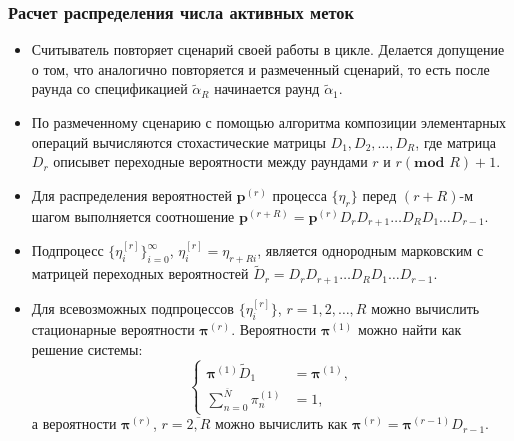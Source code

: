 \begin{frame}
    \frametitle{Расчет распределения числа активных меток}
    \footnotesize
    \begin{itemize}
        \item Считыватель повторяет сценарий своей работы в цикле. Делается допущение о том, что аналогично повторяется и размеченный сценарий, то есть после раунда со спецификацией $\widetilde{\alpha}_{R}$ начинается раунд $\widetilde{\alpha}_1$.
        \item По размеченному сценарию с помощью алгоритма композиции элементарных операций вычисляются стохастические матрицы $D_1, D_2, \dots, D_R$, где матрица $D_r$ описывет переходные вероятности между раундами $r$ и $r  (\textbf{mod } R) + 1$.
        \item Для распределения вероятностей $\bm{p}^{(r)}$ процесса $\{ \eta_r \}$ перед $(r + R)$-м шагом выполняется соотношение $\bm{p}^{(r+R)} = \bm{p}^{(r)} D_r D_{r+1} \dots D_R D_1 \dots D_{r-1}$.
        \item Подпроцесс $\{ \eta_i^{[r]} \}_{i=0}^\infty$, $\eta_i^{[r]} = \eta_{r+Ri}$, является однородным марковским с матрицей переходных вероятностей $\widetilde{D}_r = D_r D_{r+1} \dots D_R D_1 \dots D_{r-1}$.
        \item Для всевозможных подпроцессов $\{ \eta_i^{[r]} \}$, $r = 1, 2, \dots, R$ можно вычислить стационарные вероятности $\bm{\pi}^{(r)}$. Вероятности $\bm{\pi}^{(1)}$ можно найти как решение системы:
        \begin{equation*}
            \begin{cases}
                \bm{\pi}^{(1)} \widetilde{D}_1 &= \bm{\pi}^{(1)},\\
                \sum\limits_{n=0}^{\overline{N}} \pi^{(1)}_n &= 1,
            \end{cases}
        \end{equation*}
        а вероятности $\bm{\pi}^{(r)}$, $r = \overline{2, R}$ можно вычислить как $\bm{\pi}^{(r)} = \bm{\pi}^{(r-1)} D_{r-1}$.
    \end{itemize}
\end{frame}

